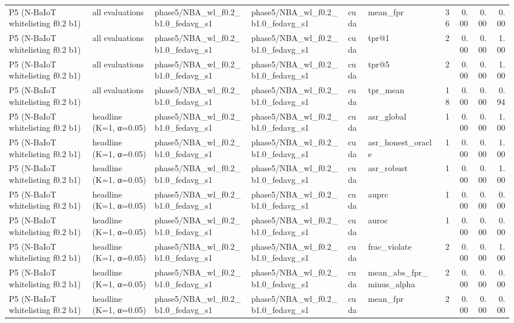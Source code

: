 \begin{tabular}{llllllrrrr}
P5 (N-BaIoT whitelisting f0.2 b1) & all evaluations & phase5/NBA\_wl\_f0.2\_b1.0\_fedavg\_s1 & phase5/NBA\_wl\_f0.2\_b1.0\_fedavg\_s1 & cuda & mean\_fpr & 36 & 0.00 & 0.00 & 0.00 \\
P5 (N-BaIoT whitelisting f0.2 b1) & all evaluations & phase5/NBA\_wl\_f0.2\_b1.0\_fedavg\_s1 & phase5/NBA\_wl\_f0.2\_b1.0\_fedavg\_s1 & cuda & tpr@1 & 2 & 0.00 & 0.00 & 1.00 \\
P5 (N-BaIoT whitelisting f0.2 b1) & all evaluations & phase5/NBA\_wl\_f0.2\_b1.0\_fedavg\_s1 & phase5/NBA\_wl\_f0.2\_b1.0\_fedavg\_s1 & cuda & tpr@5 & 2 & 0.00 & 0.00 & 1.00 \\
P5 (N-BaIoT whitelisting f0.2 b1) & all evaluations & phase5/NBA\_wl\_f0.2\_b1.0\_fedavg\_s1 & phase5/NBA\_wl\_f0.2\_b1.0\_fedavg\_s1 & cuda & tpr\_mean & 18 & 0.00 & 0.00 & 0.94 \\
P5 (N-BaIoT whitelisting f0.2 b1) & headline (K=1, α=0.05) & phase5/NBA\_wl\_f0.2\_b1.0\_fedavg\_s1 & phase5/NBA\_wl\_f0.2\_b1.0\_fedavg\_s1 & cuda & asr\_global & 1 & 0.00 & 0.00 & 1.00 \\
P5 (N-BaIoT whitelisting f0.2 b1) & headline (K=1, α=0.05) & phase5/NBA\_wl\_f0.2\_b1.0\_fedavg\_s1 & phase5/NBA\_wl\_f0.2\_b1.0\_fedavg\_s1 & cuda & asr\_honest\_oracle & 1 & 0.00 & 0.00 & 1.00 \\
P5 (N-BaIoT whitelisting f0.2 b1) & headline (K=1, α=0.05) & phase5/NBA\_wl\_f0.2\_b1.0\_fedavg\_s1 & phase5/NBA\_wl\_f0.2\_b1.0\_fedavg\_s1 & cuda & asr\_robust & 1 & 0.00 & 0.00 & 1.00 \\
P5 (N-BaIoT whitelisting f0.2 b1) & headline (K=1, α=0.05) & phase5/NBA\_wl\_f0.2\_b1.0\_fedavg\_s1 & phase5/NBA\_wl\_f0.2\_b1.0\_fedavg\_s1 & cuda & auprc & 1 & 0.00 & 0.00 & 0.00 \\
P5 (N-BaIoT whitelisting f0.2 b1) & headline (K=1, α=0.05) & phase5/NBA\_wl\_f0.2\_b1.0\_fedavg\_s1 & phase5/NBA\_wl\_f0.2\_b1.0\_fedavg\_s1 & cuda & auroc & 1 & 0.00 & 0.00 & 0.00 \\
P5 (N-BaIoT whitelisting f0.2 b1) & headline (K=1, α=0.05) & phase5/NBA\_wl\_f0.2\_b1.0\_fedavg\_s1 & phase5/NBA\_wl\_f0.2\_b1.0\_fedavg\_s1 & cuda & frac\_violate & 2 & 0.00 & 0.00 & 1.00 \\
P5 (N-BaIoT whitelisting f0.2 b1) & headline (K=1, α=0.05) & phase5/NBA\_wl\_f0.2\_b1.0\_fedavg\_s1 & phase5/NBA\_wl\_f0.2\_b1.0\_fedavg\_s1 & cuda & mean\_abs\_fpr\_minus\_alpha & 2 & 0.00 & 0.00 & 0.00 \\
P5 (N-BaIoT whitelisting f0.2 b1) & headline (K=1, α=0.05) & phase5/NBA\_wl\_f0.2\_b1.0\_fedavg\_s1 & phase5/NBA\_wl\_f0.2\_b1.0\_fedavg\_s1 & cuda & mean\_fpr & 2 & 0.00 & 0.00 & 0.00 \\

\end{tabular}
